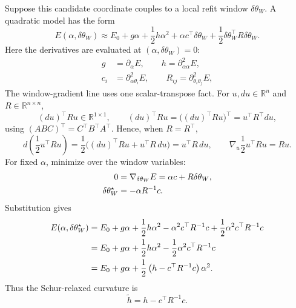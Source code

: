 \documentclass[10pt,twocolumn]{article}
\newcommand{\R}{\mathbb R}
\begin{document}
Suppose this candidate coordinate couples to a local refit window $\delta\theta_W$. A quadratic model has the form
\begin{equation}
E(\alpha,\delta\theta_W)
\approx E_0+g\alpha+\frac12h\alpha^2
+\alpha c^\top\delta\theta_W
+\frac12\delta\theta_W^\top R\delta\theta_W.
\label{eq:quadratic_model}
\end{equation}
Here the derivatives are evaluated at \((\alpha,\delta\theta_W)=0\):
\begin{equation}
\begin{aligned}
g&=\partial_\alpha E,
\qquad
h=\partial_{\alpha\alpha}^2E,\\
c_i&=\partial_{\alpha\theta_i}^2E,
\qquad
R_{ij}=\partial_{\theta_i\theta_j}^2E,
\end{aligned}
\label{eq:local_energy_derivatives}
\end{equation}
The window-gradient line uses one scalar-transpose fact. For
\(u,du\in\R^n\) and \(R\in\R^{n\times n}\),
\begin{equation}
(du)^\top R u\in\R^{1\times1},
\qquad
(du)^\top R u
=\big((du)^\top R u\big)^\top
=u^\top R^\top du,
\label{eq:scalar_transpose_note}
\end{equation}
using \((ABC)^\top=C^\top B^\top A^\top\). Hence, when \(R=R^\top\),
\begin{equation}
d\!\left(\frac12 u^\top R u\right)
=\frac12\big((du)^\top R u+u^\top R\,du\big)
=u^\top R\,du,
\qquad
\nabla_u\frac12u^\top Ru=Ru.
\label{eq:quadratic_gradient_note}
\end{equation}
For fixed $\alpha$, minimize over the window variables:
\begin{align}
0&=\nabla_{\delta\theta_W}E
=\alpha c+R\delta\theta_W,\notag\\
\delta\theta_W^\star&=-\alpha R^{-1}c.
\label{eq:window_star}
\end{align}
Substitution gives
\begin{align}
E(\alpha,\delta\theta_W^\star)
&=E_0+g\alpha+\frac12h\alpha^2
-\alpha^2c^\top R^{-1}c
+\frac12\alpha^2c^\top R^{-1}c\notag\\
&=E_0+g\alpha+\frac12h\alpha^2
-\frac12\alpha^2c^\top R^{-1}c\notag\\
&=E_0+g\alpha
+\frac12\left(h-c^\top R^{-1}c\right)\alpha^2.
\label{eq:schur_curvature_derivation}
\end{align}
Thus the Schur-relaxed curvature is
\begin{equation}
\widetilde h=h-c^\top R^{-1}c.
\label{eq:h_schur}
\end{equation}
\end{document}
